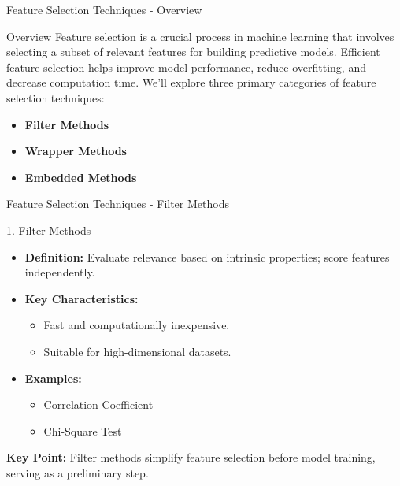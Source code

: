\documentclass[aspectratio=169]{beamer}
\begin{document}
\begin{frame}[fragile]{Feature Selection Techniques - Overview}
    \begin{block}{Overview}
        Feature selection is a crucial process in machine learning that involves selecting a subset of relevant features for building predictive models.
        Efficient feature selection helps improve model performance, reduce overfitting, and decrease computation time. 
        We'll explore three primary categories of feature selection techniques:
        \begin{itemize}
            \item \textbf{Filter Methods}
            \item \textbf{Wrapper Methods}
            \item \textbf{Embedded Methods}
        \end{itemize}
    \end{block}
\end{frame}

\begin{frame}[fragile]{Feature Selection Techniques - Filter Methods}
    \begin{block}{1. Filter Methods}
        \begin{itemize}
            \item \textbf{Definition:} Evaluate relevance based on intrinsic properties; score features independently.
            \item \textbf{Key Characteristics:}
            \begin{itemize}
                \item Fast and computationally inexpensive.
                \item Suitable for high-dimensional datasets.
            \end{itemize}
            \item \textbf{Examples:}
            \begin{itemize}
                \item Correlation Coefficient
                \item Chi-Square Test
            \end{itemize}
        \end{itemize}
        \textbf{Key Point:} Filter methods simplify feature selection before model training, serving as a preliminary step.
    \end{block}
\end{frame}
\end{document}
